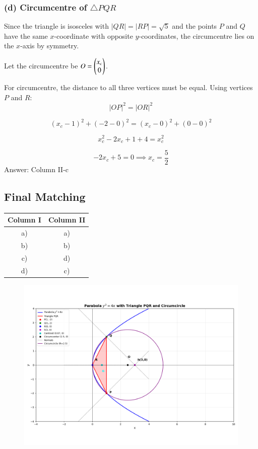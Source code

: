 \documentclass[article]{IEEEtran}
\begin{document}
\subsubsection*{(d) Circumcentre of $\triangle PQR$}
Since the triangle is isosceles with $|QR| = |RP| = \sqrt{5}$ and the points $P$ and $Q$ have the same $x$-coordinate with opposite $y$-coordinates, the circumcentre lies on the $x$-axis by symmetry.

Let the circumcentre be $O = \begin{pmatrix}x_c\\0\end{pmatrix}$.

For circumcentre, the distance to all three vertices must be equal. Using vertices $P$ and $R$:
\begin{equation}
	|OP|^2 = |OR|^2
\end{equation}

\begin{equation}
	(x_c - 1)^2 + (-2 - 0)^2 = (x_c - 0)^2 + (0 - 0)^2
\end{equation}

\begin{equation}
	x_c^2 - 2x_c + 1 + 4 = x_c^2
\end{equation}

\begin{equation}
	-2x_c + 5 = 0 \implies x_c = \frac{5}{2}
\end{equation}
Answer: Column II-c

\subsection*{Final Matching}

\begin{center}
	\begin{tabular}{|c|c|}
		\hline
		\textbf{Column I} & \textbf{Column II} \\
		\hline
		a) & a) \\
		b) & b) \\
		c) & d) \\
		d) & c) \\
		\hline
	\end{tabular}
\end{center}

\begin{figure}[H]
	\centering
	\includegraphics[width=1\linewidth]{figs/Figure_1}
	\caption{}
	\label{fig:figure1}
\end{figure}
\end{document}
